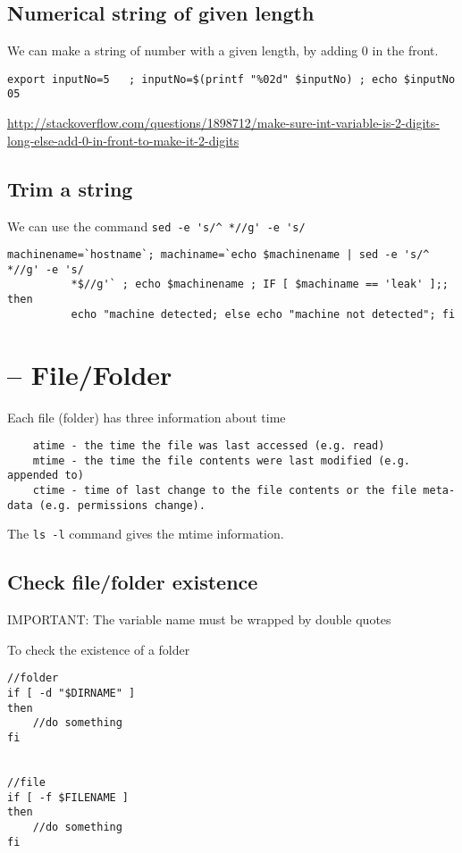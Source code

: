 \subsection{Numerical string of given length}

We can make a string of number with a given length, by adding 0 in the front.
\begin{verbatim}
export inputNo=5   ; inputNo=$(printf "%02d" $inputNo) ; echo $inputNo
05
\end{verbatim}

\url{http://stackoverflow.com/questions/1898712/make-sure-int-variable-is-2-digits-long-else-add-0-in-front-to-make-it-2-digits}


\subsection{Trim a string}

We can use the command \verb!sed -e 's/^ *//g' -e 's/!
\begin{verbatim}
machinename=`hostname`; machiname=`echo $machinename | sed -e 's/^ *//g' -e 's/
          *$//g'` ; echo $machinename ; IF [ $machiname == 'leak' ];; then 
          echo "machine detected; else echo "machine not detected"; fi
\end{verbatim}

\section{-- File/Folder}

Each file (folder) has three information about time
\begin{verbatim}
    atime - the time the file was last accessed (e.g. read)
    mtime - the time the file contents were last modified (e.g. appended to)
    ctime - time of last change to the file contents or the file meta-data (e.g. permissions change).
\end{verbatim}
The \verb!ls -l! command gives the mtime information. 


\subsection{Check file/folder existence}

IMPORTANT: The variable name must be wrapped by double quotes 

To check the existence of a folder
\begin{verbatim}
//folder
if [ -d "$DIRNAME" ]
then
	//do something
fi


//file
if [ -f $FILENAME ]
then
	//do something
fi
\end{verbatim}

